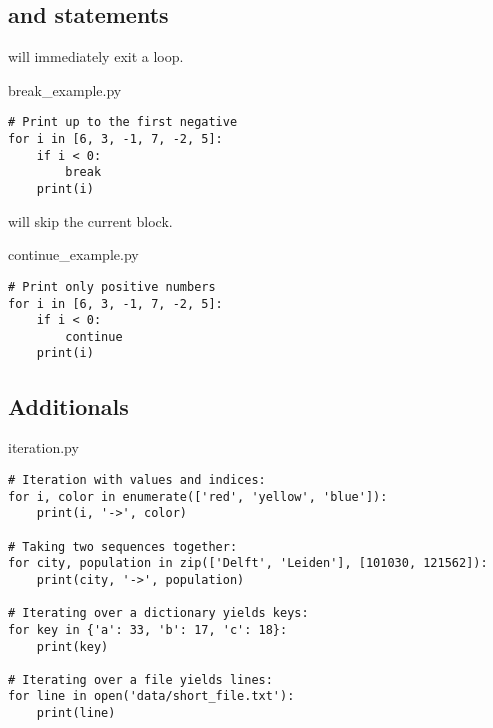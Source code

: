 \documentclass[aspectratio=1610,t]{beamer}
\begin{document}
\subsection{ and  statements}
\begin{pframe}
 \pause
 \begin{minipage}[t]{0.48\textwidth}
   will immediately exit a loop.
  \begin{pythonfile}{break\_example.py}
   \begin{verbatim}
# Print up to the first negative
for i in [6, 3, -1, 7, -2, 5]:
    if i < 0:
        break
    print(i)
   \end{verbatim}
  \end{pythonfile}
  \pause
  \begin{terminal}
  \end{terminal}
 \end{minipage}\qquad%
 \pause
 \begin{minipage}[t]{0.48\textwidth}
  will skip the current block.
  \begin{pythonfile}{continue\_example.py}
   \begin{verbatim}
# Print only positive numbers
for i in [6, 3, -1, 7, -2, 5]:
    if i < 0:
        continue
    print(i)
   \end{verbatim}
  \end{pythonfile}
  \pause
  \begin{terminal}
  \end{terminal}
 \end{minipage}\qquad
\end{pframe}


\subsection{Additionals}
\begin{pframe}
 \begin{pythonfile}{iteration.py}
  \begin{verbatim}
# Iteration with values and indices:
for i, color in enumerate(['red', 'yellow', 'blue']):
    print(i, '->', color)

# Taking two sequences together:
for city, population in zip(['Delft', 'Leiden'], [101030, 121562]):
    print(city, '->', population)

# Iterating over a dictionary yields keys:
for key in {'a': 33, 'b': 17, 'c': 18}:
    print(key)

# Iterating over a file yields lines:
for line in open('data/short_file.txt'):
    print(line)
  \end{verbatim}
 \end{pythonfile}
\end{pframe}
\end{document}
